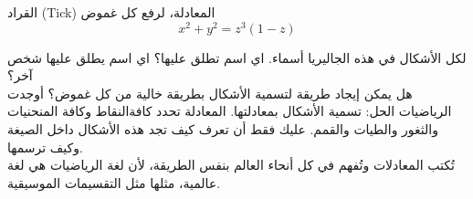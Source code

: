 \begin{surferPage}{القراد (Tick)}
المعادلة، لرفع كل غموض \\
\smallskip
\[x^2 + y^2	= z^3	(1 - z) \]


\singlespacing
لكل الأشكال في هذه الجاليريا أسماء. اي اسم تطلق عليها؟ اي اسم يطلق عليها شخص آخر؟\\
\vspace{0.3cm}
هل يمكن إيجاد طريقة لتسمية الأشكال بطريقة خالية من كل غموض؟ أوجدت الرياضيات الحل: تسمية الأشكال بمعادلتها. المعادلة تحدد كافةالنقاط وكافة المنحنيات والثغور والطيات والقمم. عليك فقط أن تعرف كيف تجد هذه الأشكال داخل الصيغة وكيف ترسمها.\\
\vspace{0.3cm}
تُكتب المعادلات وتُفهم في كل أنحاء العالم بنفس الطريقة، لأن لغة الرياضيات هي لغة عالمية، مثلها مثل التقسيمات الموسيقية.
\end{surferPage}
